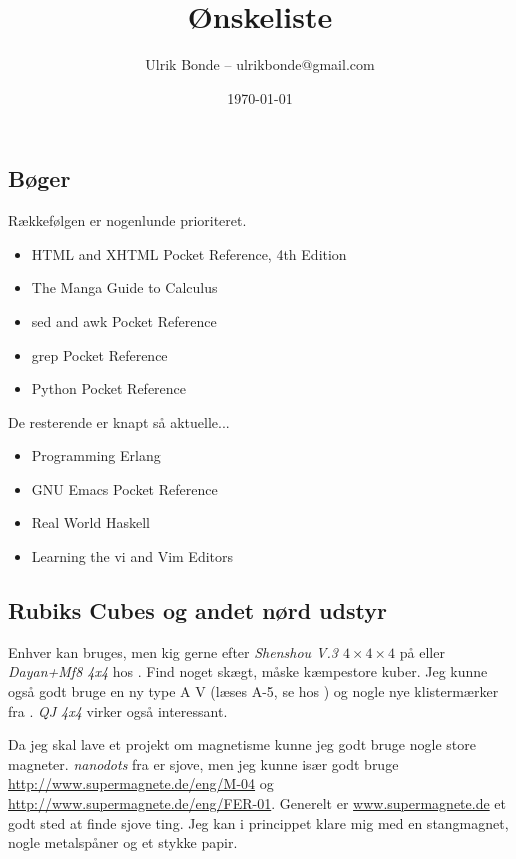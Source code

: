\documentclass[a4paper, danish, 10pt, final]{article}
\title{Ønskeliste}
\author{Ulrik Bonde -- ulrikbonde@gmail.com}
\date{\today}
\begin{document}
\maketitle

\subsection*{Bøger}

Rækkefølgen er nogenlunde prioriteret.
\begin{itemize}
    \item HTML and XHTML Pocket Reference, 4th Edition \cite{htmlxhtml}
    \item The Manga Guide to Calculus \citep{kojima2009calc}
    \item sed and awk Pocket Reference \citep{robbins200206}
    \item grep Pocket Reference \citep{bambenekKlus200901}
    \item Python Pocket Reference \citep{lutz2009python}
\end{itemize}
De resterende er knapt så aktuelle...
\begin{itemize}
    \item Programming Erlang \citep{armstrong2007pe}
    \item GNU Emacs Pocket Reference \citep{cameron199811}
    \item Real World Haskell \citep{osullivanGoerzenStewart200812}
    \item Learning the vi and Vim Editors \citep{robbinsHannahLamb200807}
\end{itemize}

\subsection*{Rubiks Cubes og andet nørd udstyr}

Enhver kan bruges, men kig gerne efter \emph{Shenshou V.3 $4\times4\times4$} på
\cite{gamesweb} eller \emph{Dayan+Mf8 4x4} hos \cite{cubikon}. Find noget
skægt, måske kæmpestore kuber. Jeg kunne også godt bruge en ny type A V (læses
        A-5, se hos \cite{gamesweb}) og nogle nye klistermærker fra
\cite{cubesmith}. \emph{QJ 4x4} virker også interessant.

Da jeg skal lave et projekt om magnetisme kunne jeg godt bruge nogle store
magneter. \emph{nanodots} fra \cite{gamesweb} er sjove, men jeg kunne især godt
bruge \url{http://www.supermagnete.de/eng/M-04} og
\url{http://www.supermagnete.de/eng/FER-01}. Generelt er
\url{www.supermagnete.de} et godt sted at finde sjove ting. Jeg kan i
princippet klare mig med en stangmagnet, nogle metalspåner og et stykke papir.
\end{document}
